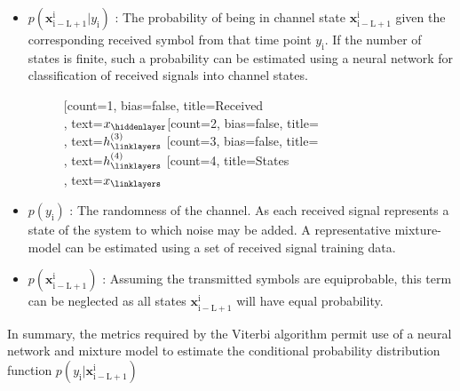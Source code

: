 \documentclass[12pt,a4paper]{report}
\begin{document}
\begin{itemize}
\item $p(\mathbf{x}_{\mathrm{i-L+1}}^{\mathrm{i}}|y_{\mathrm{i}})$
: The probability of being in channel state $\mathbf{x}_{\mathrm{i-L+1}}^{\mathrm{i}}$ given the corresponding received symbol from that time point $y_{\mathrm{i}}$. If the number of states is finite, such a probability can be estimated using a neural network for classification of received signals into channel states. 
	\begin{figure}[H]
	\centering
		\begin{neuralnetwork}[height=4, nodespacing=10mm, layerspacing=15mm]
		\newcommand{\x}[2]{$x_#2$}
		\newcommand{\y}[2]{$\hat{y}_#2$}
		\newcommand{\hfirst}[2]{\small $h^{(1)}_#2$}
		\newcommand{\hsecond}[2]{\small $h^{(2)}_#2$}
		\newcommand{\hthird}[2]{\small $h^{(3)}_#2$}
		\newcommand{\hfourth}[2]{\small $h^{(4)}_#2$}
		[count=1, bias=false, title=Received\\, text=\x]
		\hiddenlayer[count=2, bias=false, title=\\, text=\hthird] \linklayers
		\hiddenlayer[count=3, bias=false, title=\\, text=\hfourth] \linklayers
		\outputlayer[count=4, title=States\\, text=\x] \linklayers
	    \end{neuralnetwork}
	\end{figure}



\item $p(y_{\mathrm{i}})$
: The randomness of the channel. As each received signal represents a state of the system to which noise may be added. A representative mixture-model can be estimated using a set of received signal training data. 


\item $p(\mathbf{x}_{\mathrm{i-L+1}}^{\mathrm{i}})$
: Assuming the transmitted symbols are equiprobable, this term can be neglected as all states $\mathbf{x}_{\mathrm{i-L+1}}^{\mathrm{i}}$ will have equal probability. 

\end{itemize}

In summary, the metrics required by the Viterbi algorithm permit use of a neural network and mixture model to estimate the conditional probability distribution function $p(y_{\mathrm{i}}|\mathbf{x}_{\mathrm{i-L+1}}^{\mathrm{i}})$
\end{document}
